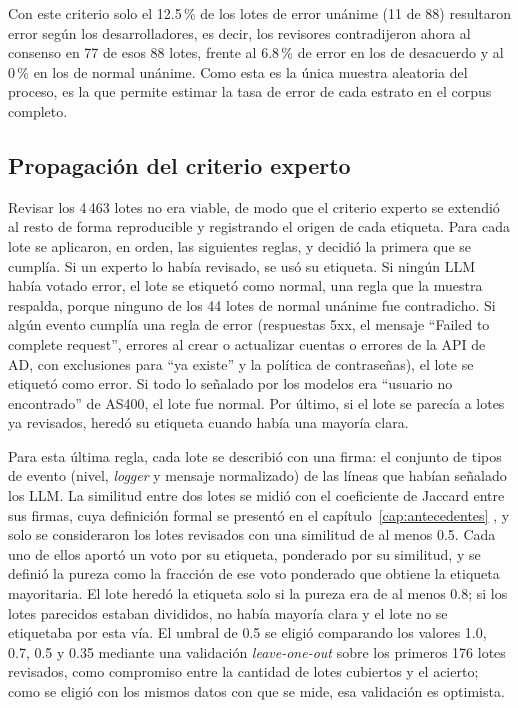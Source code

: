 Con este criterio solo el 12.5\,\% de los lotes de error unánime (11 de 88) resultaron error según los desarrolladores, es decir, los revisores contradijeron ahora al consenso en 77 de esos 88 lotes, frente al 6.8\,\% de error en los de desacuerdo y al 0\,\% en los de normal unánime. Como esta es la única muestra aleatoria del proceso, es la que permite estimar la tasa de error de cada estrato en el corpus completo.

\subsection{Propagación del criterio experto}\label{subsec:met_propagacion}

Revisar los 4\,463 lotes no era viable, de modo que el criterio experto se extendió al resto de forma reproducible y registrando el origen de cada etiqueta. Para cada lote se aplicaron, en orden, las siguientes reglas, y decidió la primera que se cumplía. Si un experto lo había revisado, se usó su etiqueta. Si ningún LLM había votado error, el lote se etiquetó como normal, una regla que la muestra respalda, porque ninguno de los 44 lotes de normal unánime fue contradicho. Si algún evento cumplía una regla de error (respuestas 5xx, el mensaje ``Failed to complete request'', errores al crear o actualizar cuentas o errores de la API de AD, con exclusiones para ``ya existe'' y la política de contraseñas), el lote se etiquetó como error. Si todo lo señalado por los modelos era ``usuario no encontrado'' de AS400, el lote fue normal. Por último, si el lote se parecía a lotes ya revisados, heredó su etiqueta cuando había una mayoría clara.

Para esta última regla, cada lote se describió con una firma: el conjunto de tipos de evento (nivel, \textit{logger} y mensaje normalizado) de las líneas que habían señalado los LLM. La similitud entre dos lotes se midió con el coeficiente de Jaccard entre sus firmas, cuya definición formal se presentó en el capítulo~\ref{cap:antecedentes} \cite{manning2008_ir}, y solo se consideraron los lotes revisados con una similitud de al menos 0.5. Cada uno de ellos aportó un voto por su etiqueta, ponderado por su similitud, y se definió la pureza como la fracción de ese voto ponderado que obtiene la etiqueta mayoritaria. El lote heredó la etiqueta solo si la pureza era de al menos 0.8; si los lotes parecidos estaban divididos, no había mayoría clara y el lote no se etiquetaba por esta vía. El umbral de 0.5 se eligió comparando los valores 1.0, 0.7, 0.5 y 0.35 mediante una validación \textit{leave-one-out} sobre los primeros 176 lotes revisados, como compromiso entre la cantidad de lotes cubiertos y el acierto; como se eligió con los mismos datos con que se mide, esa validación es optimista.

